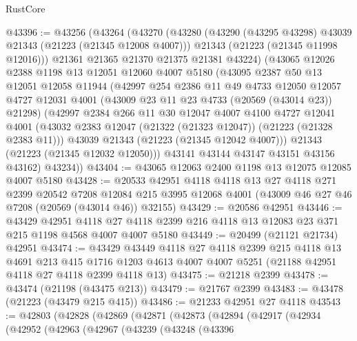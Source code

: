 \begin{lexlean}{RustCore}
\begin{coremodule}
@43396 := @43256
    (@43264
      (@43270
        (@43280
          (@43290 (@43295 @43298) @43039 @21343 (@21223 (@21345 @12008 @4007)))
          @21343
          (@21223 (@21345 @11998 @12016)))
        @21361
        @21365
        @21370
        @21375
        @21381
        @43224)
      (@43065
        @12026
        @2388
        @1198
        @13
        @12051
        @12060
        @4007
        @5180
        (@43095
          @2387
          @50
          @13
          @12051
          @12058
          @11944
          (@42997
            @254
            @2386
            @11
            @49
            @4733
            @12050
            @12057
            @4727
            @12031
            @4001
            (@43009 @23 @11 @23 @4733 (@20569 (@43014 @23)) @21298)
            (@42997
              @2384
              @266
              @11
              @30
              @12047
              @4007
              @4100
              @4727
              @12041
              @4001
              (@43032 @2383 @12047 (@21322 (@21323 @12047)) (@21223 (@21328 @2383 @11)))
              @43039
              @21343
              (@21223 (@21345 @12042 @4007)))
            @21343
            (@21223 (@21345 @12032 @12050)))
          @43141
          @43144
          @43147
          @43151
          @43156
          @43162)
        @43234))
@43404 := @43065 @12063 @2400 @1198 @13 @12075 @12085 @4007 @5180
@43428 := @20533
    @42951
    @4118
    @4118
    @13
    @27
    @4118
    @271
    @2399
    @20542
    @7208
    @12084
    @215
    @3995
    @12068
    @4001
    (@43009 @46 @27 @46 @7208 (@20569 (@43014 @46)) @32155)
@43429 := @20586 @42951
@43446 := @43429
    @42951
    @4118
    @27
    @4118
    @2399
    @216
    @4118
    @13
    @12083
    @23
    @371
    @215
    @1198
    @4568
    @4007
    @4007
    @5180
@43449 := @20499 (@21121 @21734) @42951
@43474 := @43429
    @43449
    @4118
    @27
    @4118
    @2399
    @215
    @4118
    @13
    @4691
    @213
    @415
    @1716
    @1203
    @4613
    @4007
    @4007
    @5251
    (@21188 @42951 @4118 @27 @4118 @2399 @4118 @13)
@43475 := @21218 @2399
@43478 := @43474 (@21198 (@43475 @213))
@43479 := @21767 @2399
@43483 := @43478 (@21223 (@43479 @215 @415))
@43486 := @21233 @42951 @27 @4118
@43543 := @42803
    (@42828
      (@42869
        (@42871
          (@42873
            (@42894
              (@42917
                (@42934
                  (@42952
                    (@42963
                      (@42967
                        (@43239
                          (@43248
                            (@43396

\end{coremodule}
\end{lexlean}
